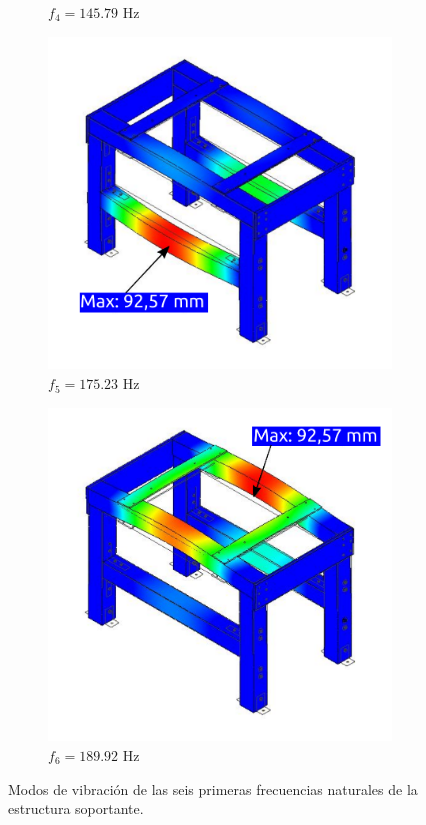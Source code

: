\begin{figure}[]
\begin{subfigure}{0.5\linewidth}
		\caption{$f_4 = 145.79$ Hz}\label{fig:frecuencia_4}
	\end{subfigure}
		\begin{subfigure}{0.5\linewidth}
		\centering
		\includegraphics[width=0.9\linewidth]{Imagenes/F5.pdf}
		\caption{$f_5 = 175.23$ Hz}\label{fig:frecuencia_5}
	\end{subfigure}%
	\begin{subfigure}{0.5\linewidth}
		\centering
		\includegraphics[width=0.9\linewidth]{Imagenes/F6.pdf}
		\caption{$f_6 = 189.92$ Hz}\label{fig:frecuencia_6}
	\end{subfigure}
\caption{Modos de vibración de las seis primeras frecuencias naturales de la estructura soportante.}
\label{fig:frecuencias_mesa}
\end{figure}


